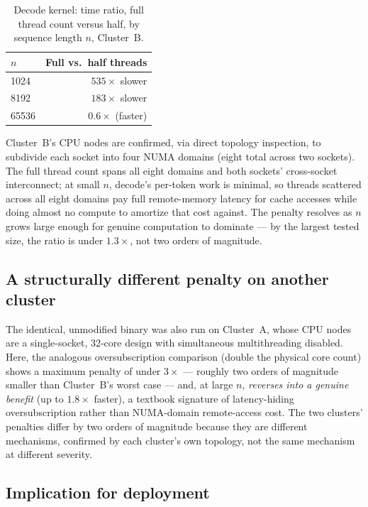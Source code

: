 \documentclass[conference]{IEEEtran}
\begin{document}
\begin{table}[t]
\centering
\caption{Decode kernel: time ratio, full thread count versus half, by
sequence length $n$, Cluster~B.}
\label{tab:numa}
\begin{tabular}{lr}
\toprule
$n$ & Full vs.\ half threads \\
\midrule
1024 & $535\times$ slower \\
8192 & $183\times$ slower \\
65536 & $0.6\times$ (faster) \\
\bottomrule
\end{tabular}
\end{table}

Cluster~B's CPU nodes are confirmed, via direct topology inspection, to
subdivide each socket into four NUMA domains (eight total across two
sockets). The full thread count spans all eight domains and both
sockets' cross-socket interconnect; at small $n$, decode's per-token
work is minimal, so threads scattered across all eight domains pay
full remote-memory latency for cache accesses while doing almost no
compute to amortize that cost against. The penalty resolves as $n$
grows large enough for genuine computation to dominate --- by the
largest tested size, the ratio is under $1.3\times$, not two orders of
magnitude.

\subsection{A structurally different penalty on another cluster}

The identical, unmodified binary was also run on Cluster~A, whose CPU
nodes are a single-socket, 32-core design with simultaneous
multithreading disabled. Here, the analogous oversubscription
comparison (double the physical core count) shows a maximum penalty of
under $3\times$ --- roughly two orders of magnitude smaller than
Cluster~B's worst case --- and, at large $n$, \emph{reverses into a
genuine benefit} (up to $1.8\times$ faster), a textbook signature of
latency-hiding oversubscription rather than NUMA-domain remote-access
cost. The two clusters' penalties differ by two orders of magnitude
because they are different mechanisms, confirmed by each cluster's own
topology, not the same mechanism at different severity.

\subsection{Implication for deployment}
\end{document}

